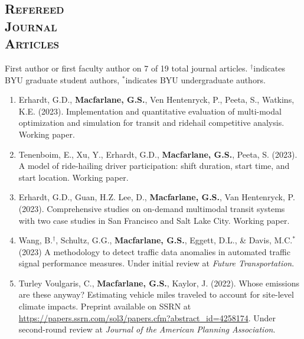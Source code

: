 \documentclass[margin,line]{res}
\newif\ifdetail
\newcounter{enuminitialize}
\newenvironment{myenum}[1][]
{%
 \setcounter{enuminitialize}{#1}
 \addtocounter{enuminitialize}{2}
 \begin{enumerate}[left= 4pt, itemsep=12pt, start=\value{enuminitialize}, label=\arabic*\addtocounter{enumi}{-2}]
}
{%
 \end{enumerate}
}
\newcommand{\secfont}{\scshape }
\begin{document}
\begin{resume}

\section{\secfont Refereed \\ Journal\\ Articles}
First author or first faculty author on 7 of 19 total journal articles.
$^\dagger$indicates BYU graduate student authors, $^*$indicates BYU undergraduate authors.
\ifdetail Paper 1 came from my undergraduate work, papers 2 through 6 were from my doctoral research, and
papers 7 through 15 represent work completed during my time on the faculty at BYU. Number of citations
are from Google Scholar as of December 2021. \fi
\vspace{.3cm}

\begin{myenum}[19]

  \item Erhardt, G.D., \textbf{Macfarlane, G.S.}, Ven Hentenryck, P., Peeta, S., Watkins, K.E. (2023). Implementation and quantitative evaluation of multi-modal optimization and simulation for transit and ridehail competitive analysis. Working paper.

  \item Tenenboim, E., Xu, Y., Erhardt, G.D.,  \textbf{Macfarlane, G.S.}, Peeta, S.
  (2023).  A model of ride-hailing driver participation: shift duration, start
  time, and start location. Working paper.

  \item Erhardt, G.D., Guan, H.Z. Lee, D., \textbf{Macfarlane, G.S.}, Van Hentenryck,
  P. (2023). Comprehensive studies on on-demand multimodal transit systems with
  two case studies in San Francisco and Salt Lake City. Working paper.

  \item  Wang, B.$^\dagger$, Schultz, G.G., \textbf{Macfarlane, G.S.}, Eggett, D.L., 
  \& Davis, M.C.$^*$ (2023) A methodology to detect traffic data anomalies in automated traffic 
  signal performance measures. Under initial review at \textit{Future Transportation}.

  \item Turley Voulgaris, C., \textbf{Macfarlane, G.S.}, Kaylor, J. (2022).
  Whose emissions are these anyway? Estimating vehicle miles traveled to account for site-level climate impacts.
  Preprint available on SSRN at \url{https://papers.ssrn.com/sol3/papers.cfm?abstract_id=4258174}.
  Under second-round review at \textit{Journal of the American Planning Association}.


\end{myenum}
\end{resume}
\end{document}

